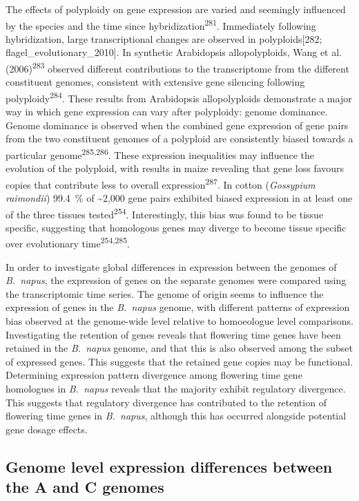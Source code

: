 \documentclass[12pt,]{book}
\begin{document}
The effects of polyploidy on gene expression are varied and seemingly
influenced by the species and the time since
hybridization\textsuperscript{281}. Immediately following hybridization,
large transcriptional changes are observed in polyploids{[}282;
flagel\_evolutionary\_2010{]}. In synthetic Arabidopsis allopolyploids,
Wang et al. (2006)\textsuperscript{283} observed different contributions
to the transcriptome from the different constituent genomes, consistent
with extensive gene silencing following polyploidy\textsuperscript{284}.
These results from Arabidopsis allopolyploids demonstrate a major way in
which gene expression can vary after polyploidy: genome dominance.
Genome dominance is observed when the combined gene expression of gene
pairs from the two constituent genomes of a polyploid are consistently
biased towards a particular genome\textsuperscript{285,286}. These
expression inequalities may influence the evolution of the polyploid,
with results in maize revealing that gene loss favours copies that
contribute less to overall expression\textsuperscript{287}. In cotton
(\emph{Gossypium raimondii}) 99.4~\% of \textasciitilde{}2,000 gene
pairs exhibited biased expression in at least one of the three tissues
tested\textsuperscript{254}. Interestingly, this bias was found to be
tissue specific, suggesting that homologous genes may diverge to become
tissue specific over evolutionary time\textsuperscript{254,285}.

In order to investigate global differences in expression between the
genomes of \emph{B.~napus}, the expression of genes on the separate
genomes were compared using the transcriptomic time series. The genome
of origin seems to influence the expression of genes in the
\emph{B.~napus} genome, with different patterns of expression bias
observed at the genome-wide level relative to homoeologue level
comparisons. Investigating the retention of genes reveals that flowering
time genes have been retained in the \emph{B.~napus} genome, and that
this is also observed among the subset of expressed genes. This suggests
that the retained gene copies may be functional. Determining expression
pattern divergence among flowering time gene homologues in
\emph{B.~napus} reveals that the majority exhibit regulatory divergence.
This suggests that regulatory divergence has contributed to the
retention of flowering time genes in \emph{B.~napus}, although this has
occurred alongside potential gene dosage effects.

\subsection{Genome level expression differences between the A and C
genomes}\label{section:spring:genomelevel}
\end{document}
